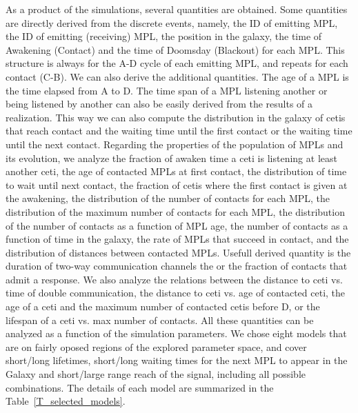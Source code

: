 \documentclass[crop]{CSLB}%
\begin{document}
As a product of the simulations, several quantities are obtained.
%
Some quantities are directly derived from the discrete events, namely,
the ID of emitting MPL, the ID of emitting (receiving) MPL, the
position in the galaxy, the time of Awakening (Contact) and the time
of Doomsday  (Blackout) for each MPL.
%
This structure is always for the A-D cycle of each emitting MPL, and
repeats for each contact (C-B).
%
We can also derive the additional quantities.
%
The age of a MPL is the time elapsed from A to D.
%
%
%
The time span of a MPL listening another or being listened by another
can also be easily derived from the results of a realization.
%
This way we can also compute the distribution in the galaxy of cetis
that reach contact and the waiting time until the first contact or the
waiting time until the next contact.
%
Regarding the properties of the population of MPLs and its evolution,
we analyze the fraction of awaken time a ceti is listening at least
another ceti, the age of contacted MPLs at first contact, the
distribution of time to wait until next contact, the fraction of cetis
where the first contact is given at the awakening, the distribution of
the number of contacts for each MPL, the distribution of the maximum
number of contacts for each MPL, the distribution of the number of
contacts as a function of MPL age, the number of contacts as a
function of time in the galaxy, the rate of MPLs that succeed in
contact, and the distribution of distances between contacted MPLs.
%
Usefull derived quantity is the duration of two-way communication
channels the or the fraction of contacts that admit a response.
% 
We also analyze the relations between the distance to ceti vs. time of
double communication, the distance to ceti vs. age of contacted ceti,
the age of a ceti and the maximum number of contacted cetis before D,
or the lifespan of a ceti vs. max number of contacts.
%
All these quantities can be analyzed as a function of the simulation
parameters.
%
We chose eight models that are on fairly oposed regions of the
explored parameter space, and cover short/long lifetimes, short/long
waiting times for the next MPL to appear in the Galaxy and
short/large range reach of the signal, including all possible
combinations.
%
The details of each model are summarized in the
Table~\ref{T_selected_models}.
\end{document}

